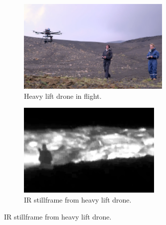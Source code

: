 \begin{figure}
    \centering
        \begin{subfigure}[b]{0.48\textwidth}
        \centering
        \includegraphics[height=4.5cm]{images/ir_drone_in_flight}
        \caption{Heavy lift drone in flight.}
        \label{figure:ir_drone_in_flight}
    \end{subfigure}
        \begin{subfigure}[b]{0.48\textwidth}
        \centering
        \includegraphics[height=4.5cm]{images/ir_drone_ir_stillframe}
        \caption{IR stillframe from heavy lift drone.}
        \label{figure:ir_drone_stillframe}
    \end{subfigure}
\end{figure}
